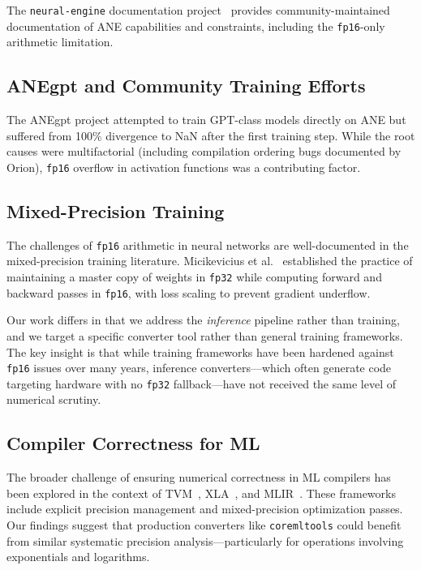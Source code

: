 \documentclass[10pt,twocolumn]{article}
\newcommand{\fp}{\texttt{fp16}}
\newcommand{\fpt}{\texttt{fp32}}
\newcommand{\ane}{ANE}
\newcommand{\coremltools}{\texttt{coremltools}}
\begin{document}
The \texttt{neural-engine} documentation
project~\citep{hollance2021ane} provides community-maintained
documentation of \ane{} capabilities and constraints, including
the \fp{}-only arithmetic limitation.

\subsection{ANEgpt and Community Training Efforts}

The ANEgpt project attempted to train GPT-class models directly on
\ane{} but suffered from 100\% divergence to NaN after the first
training step.  While the root causes were multifactorial (including
compilation ordering bugs documented by Orion), \fp{} overflow in
activation functions was a contributing factor.

\subsection{Mixed-Precision Training}

The challenges of \fp{} arithmetic in neural networks are
well-documented in the mixed-precision training literature.
Micikevicius et al.~\citep{micikevicius2018mixed} established the
practice of maintaining a master copy of weights in \fpt{} while
computing forward and backward passes in \fp{}, with loss scaling
to prevent gradient underflow.

Our work differs in that we address the \emph{inference} pipeline
rather than training, and we target a specific converter tool
rather than general training frameworks.  The key insight is that
while training frameworks have been hardened against \fp{} issues
over many years, inference converters---which often generate code
targeting hardware with no \fpt{} fallback---have not received
the same level of numerical scrutiny.

\subsection{Compiler Correctness for ML}

The broader challenge of ensuring numerical correctness in ML
compilers has been explored in the context of TVM~\citep{chen2018tvm},
XLA~\citep{xla2019}, and MLIR~\citep{lattner2021mlir}.  These
frameworks include explicit precision management and mixed-precision
optimization passes.  Our findings suggest that production
converters like \coremltools{} could benefit from similar systematic
precision analysis---particularly for operations involving
exponentials and logarithms.
\end{document}
